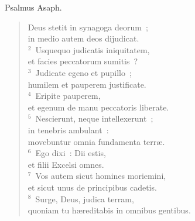 \bchapter
\lettrine[lines=3,image=true,loversize=0.05,lraise=-0.03]{P}{}salmus Asaph. \begin{flushleft}\begin{verse}\vspace{6pt}Deus stetit in synagoga deorum~;\\ in medio autem deos dijudicat.\\
${}^{2}$~Usquequo judicatis iniquitatem,\\ et facies peccatorum sumitis~?\\
${}^{3}$~Judicate egeno et pupillo~;\\ humilem et pauperem justificate.\\
${}^{4}$~Eripite pauperem,\\ et egenum de manu peccatoris liberate.\\
${}^{5}$~Nescierunt, neque intellexerunt~;\\ in tenebris ambulant~:\\ movebuntur omnia fundamenta terr\ae .\\
${}^{6}$~Ego dixi~: Dii estis,\\ et filii Excelsi omnes.\\
${}^{7}$~Vos autem sicut homines moriemini,\\ et sicut unus de principibus cadetis.\\
${}^{8}$~Surge, Deus, judica terram,\\ quoniam tu h\ae reditabis in omnibus gentibus.\end{verse}\end{flushleft}



